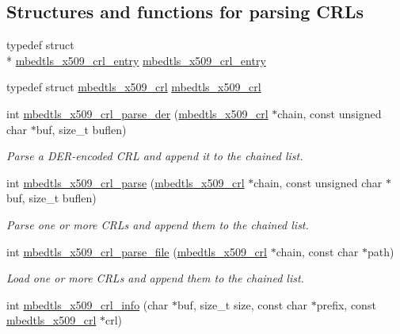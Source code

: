 \subsection*{Structures and functions for parsing C\-R\-Ls}
\begin{DoxyCompactItemize}
\item 
typedef struct \\*
\hyperlink{structmbedtls__x509__crl__entry}{mbedtls\-\_\-x509\-\_\-crl\-\_\-entry} \hyperlink{group__x509__module_ga1e0c6230061fd501f9d00bd1b09ade33}{mbedtls\-\_\-x509\-\_\-crl\-\_\-entry}
\item 
typedef struct \hyperlink{structmbedtls__x509__crl}{mbedtls\-\_\-x509\-\_\-crl} \hyperlink{group__x509__module_ga7957605a0ced963e12880ec9e19874fc}{mbedtls\-\_\-x509\-\_\-crl}
\item 
int \hyperlink{group__x509__module_ga29ab5f1216a727b334ee26cce9f5d4b5}{mbedtls\-\_\-x509\-\_\-crl\-\_\-parse\-\_\-der} (\hyperlink{structmbedtls__x509__crl}{mbedtls\-\_\-x509\-\_\-crl} $\ast$chain, const unsigned char $\ast$buf, size\-\_\-t buflen)
\begin{DoxyCompactList}\small\item\em Parse a D\-E\-R-\/encoded C\-R\-L and append it to the chained list. \end{DoxyCompactList}\item 
int \hyperlink{group__x509__module_gadfce4fc5f5af62e371695e74c5b67d70}{mbedtls\-\_\-x509\-\_\-crl\-\_\-parse} (\hyperlink{structmbedtls__x509__crl}{mbedtls\-\_\-x509\-\_\-crl} $\ast$chain, const unsigned char $\ast$buf, size\-\_\-t buflen)
\begin{DoxyCompactList}\small\item\em Parse one or more C\-R\-Ls and append them to the chained list. \end{DoxyCompactList}\item 
int \hyperlink{group__x509__module_ga8e096827f1240b8f8bc15d6a83593f22}{mbedtls\-\_\-x509\-\_\-crl\-\_\-parse\-\_\-file} (\hyperlink{structmbedtls__x509__crl}{mbedtls\-\_\-x509\-\_\-crl} $\ast$chain, const char $\ast$path)
\begin{DoxyCompactList}\small\item\em Load one or more C\-R\-Ls and append them to the chained list. \end{DoxyCompactList}\item 
int \hyperlink{group__x509__module_ga35898e101f5039c6db6b930da9892366}{mbedtls\-\_\-x509\-\_\-crl\-\_\-info} (char $\ast$buf, size\-\_\-t size, const char $\ast$prefix, const \hyperlink{structmbedtls__x509__crl}{mbedtls\-\_\-x509\-\_\-crl} $\ast$crl)

\end{DoxyCompactItemize}
